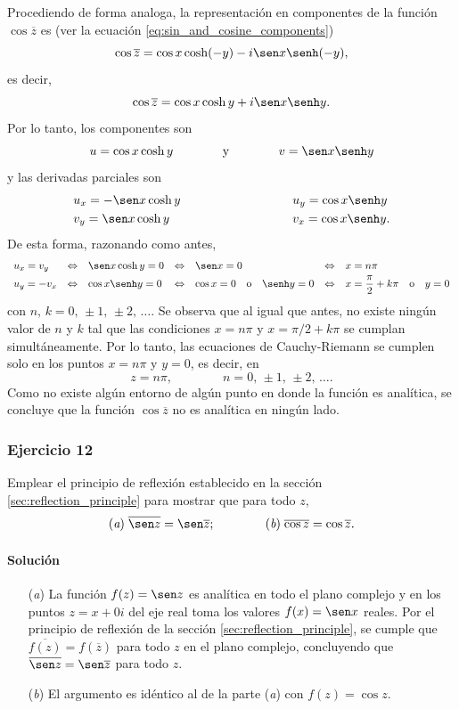 \documentclass[a4paper]{report}
\begin{document}
Procediendo de forma analoga, la representación en componentes de la función \(\cos\overline{z}\) es (ver la ecuación \ref{eq:sin_and_cosine_components})
\[
 \cos\overline{z}=\cos x\cosh(-y)-i\sen x\senh(-y),
\]
es decir,
\[
 \cos\overline{z}=\cos x\cosh y+i\sen x\senh y.
\]
Por lo tanto, los componentes son 
 \[
  u=\cos x\cosh y
  \qquad\qquad\textrm{y}\qquad\qquad
  v=\sen x\senh y
 \]
 y las derivadas parciales son
 \[
 \begin{array}{ll}
  u_x=-\sen x\cosh y\qquad\qquad\qquad\qquad&u_y=\cos x\senh y\\[\smallskipamount]
  v_y=\sen x\cosh y\qquad\qquad\qquad\qquad&v_x=\cos x\senh y.
 \end{array}
 \]
 De esta forma, razonando como antes,
 \[
 \begin{array}{lllllllll}
  u_x=v_y&\Leftrightarrow&\sen x\cosh y=0&\Leftrightarrow&\sen x=0&\Leftrightarrow&x=n\pi\\[\smallskipamount]
  u_y=-v_x&\Leftrightarrow&\cos x\senh y=0&\Leftrightarrow&\cos x=0\quad\textrm{o}\quad\senh y=0&\Leftrightarrow&x=\dfrac{\pi}{2}+k\pi\quad\textrm{o}\quad y=0
 \end{array}
 \] 
 con \(n,\,k=0,\,\pm1,\,\pm2,\,\dots\). Se observa que al igual que antes, no existe ningún valor de \(n\) y \(k\) tal que las condiciones \(x=n\pi\) y \(x=\pi/2+k\pi\) se cumplan simultáneamente. Por lo tanto, las ecuaciones de Cauchy-Riemann se cumplen solo en los puntos \(x=n\pi\) y \(y=0\), es decir, en
 \[
  z=n\pi,
  \qquad\qquad
  n=0,\,\pm1,\,\pm2,\,\dots.
 \]
Como no existe algún entorno de algún punto en donde la función es analítica, se concluye que la función \(\cos\overline{z}\) no es analítica en ningún lado. 

\subsubsection{Ejercicio 12}

Emplear el principio de reflexión establecido en la sección \ref{sec:reflection_principle} para mostrar que para todo \(z\), 
\[
 (\textit{a})\;\overline{\sen z}=\sen\overline{z};\qquad\qquad (\textit{b})\;\overline{\cos z}=\cos\overline{z}.
\]

\paragraph{Solución} 
\begin{enumerate}
 \item[(\textit{a})] La función \(f(z)=\sen z\) es analítica en todo el plano complejo y en los puntos \(z=x+0i\) del eje real toma los valores \(f(x)=\sen x\) reales. Por el principio de reflexión de la sección \ref{sec:reflection_principle}, se cumple que \(\overline{f(z)}=f(\overline{z})\) para todo \(z\) en el plano complejo, concluyendo que \(\overline{\sen z}=\sen\overline{z}\) para todo \(z\).
 \item[(\textit{b})] El argumento es idéntico al de la parte (\textit{a}) con \(f(z)=\cos z\).
\end{enumerate}
\end{document}
